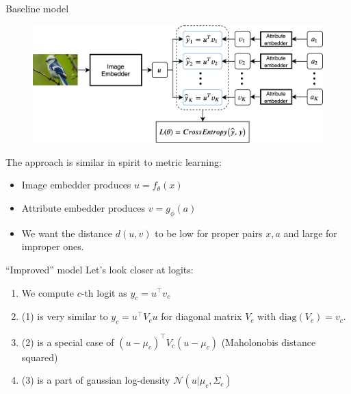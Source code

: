 \documentclass[10pt]{beamer}
\begin{document}
\begin{frame}{Baseline model}
    \begin{figure}
        \centering
        \includegraphics[width=\textwidth]{images/model-overview}
    \end{figure}
    
    \pause The approach is similar in spirit to metric learning:
    \begin{itemize}
        \item\pause Image embedder produces $u = f_\theta(x)$
        \item\pause Attribute embedder produces $v = g_\phi(a)$
        \item\pause We want the distance $d(u,v)$ to be low for proper pairs $x,a$ and large for improper ones.
    \end{itemize}
\end{frame}


\begin{frame}{``Improved'' model}
Let's look closer at logits:

\begin{enumerate}
    \item\pause We compute $c$-th logit as $y_c = u^\top v_c$
    \item\pause (1) is very similar to $y_c = u^\top V_c u$ for diagonal matrix $V_c$ with $\text{diag}(V_c) = v_c$.
    \item\pause (2) is a special case of $(u - \mu_c)^\top V_c (u - \mu_c)$ (Maholonobis distance squared)
    \item\pause (3) is a part of gaussian log-density $\mathcal{N}(u|\mu_c, \Sigma_c)$
\end{enumerate}
\end{frame}
\end{document}
